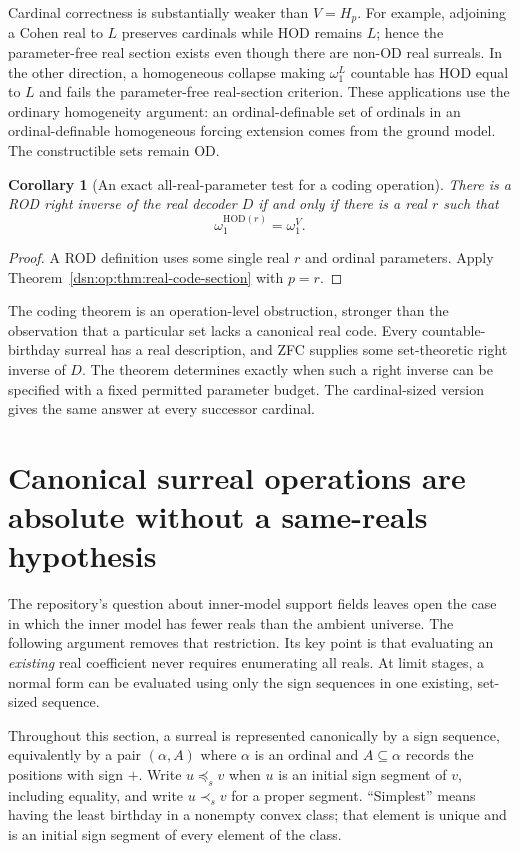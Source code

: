 \documentclass[11pt,a4paper]{article}
\numberwithin{equation}{section}
\newtheorem{corollary}[corollary]{Corollary}
\theoremstyle{definition}
\theoremstyle{remark}
\newcommand{\HOD}{\mathrm{HOD}}
\begin{document}
Cardinal correctness is substantially weaker than $V=H_p$.
For example, adjoining a Cohen real to $L$ preserves cardinals while
HOD remains $L$; hence the parameter-free real section exists even
though there are non-OD real surreals.  In the other direction, a
homogeneous collapse making $\omega_1^L$ countable has HOD equal to
$L$ and fails the parameter-free real-section criterion.  These
applications use the ordinary homogeneity argument: an ordinal-definable
set of ordinals in an ordinal-definable homogeneous forcing extension
comes from the ground model.  The constructible sets remain OD.

\begin{corollary}[An exact all-real-parameter test for a coding operation]
There is a ROD right inverse of the real decoder $D$ if and only if
there is a real $r$ such that
\[
 \omega_1^{\HOD(r)}=\omega_1^V.
\]
\end{corollary}
\begin{proof}
A ROD definition uses some single real $r$ and ordinal parameters.
Apply Theorem~\ref{dsn:op:thm:real-code-section} with $p=r$.
\end{proof}

The coding theorem is an operation-level obstruction, stronger than
the observation that a particular set lacks a canonical real code.
Every countable-birthday surreal has a real description, and ZFC
supplies some set-theoretic right inverse of $D$.  The theorem determines
exactly when such a right inverse can be specified with a fixed
permitted parameter budget.  The cardinal-sized version gives the
same answer at every successor cardinal.



\section{Canonical surreal operations are absolute without a same-reals hypothesis}
\label{dsn:op:sec:absolute-extension}

The repository's question about inner-model support fields leaves open the
case in which the inner model has fewer reals than the ambient universe.
The following argument removes that restriction.  Its key point is that
evaluating an \emph{existing} real coefficient never requires enumerating
all reals.  At limit stages, a normal form can be evaluated using only the
sign sequences in one existing, set-sized sequence.

Throughout this section, a surreal is represented canonically by a sign
sequence, equivalently by a pair $(\alpha,A)$ where $\alpha$ is an ordinal
and $A\subseteq\alpha$ records the positions with sign $+$.  Write
$u\preceq_s v$ when $u$ is an initial sign segment of $v$, including
equality, and write $u\prec_s v$ for a proper segment.  ``Simplest'' means
having the least birthday in a nonempty convex class; that element is
unique and is an initial sign segment of every element of the class.
\end{document}
